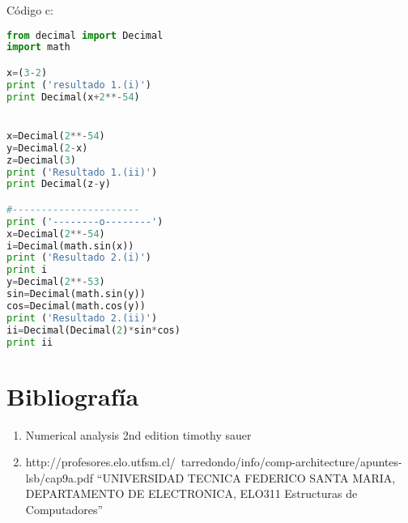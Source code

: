 \documentclass[a4paper,11pt]{article}
\begin{document}
Código c:
\begin{lstlisting}[frame=single, language=Python]
from decimal import Decimal
import math

x=(3-2)
print ('resultado 1.(i)')
print Decimal(x+2**-54)


x=Decimal(2**-54)
y=Decimal(2-x)
z=Decimal(3)
print ('Resultado 1.(ii)')
print Decimal(z-y)

#----------------------
print ('--------o--------')
x=Decimal(2**-54)
i=Decimal(math.sin(x))
print ('Resultado 2.(i)')
print i
y=Decimal(2**-53)
sin=Decimal(math.sin(y))
cos=Decimal(math.cos(y))
print ('Resultado 2.(ii)')
ii=Decimal(Decimal(2)*sin*cos)
print ii
\end{lstlisting}
\section{Bibliografía}
\begin{enumerate}
 \item Numerical analysis 2nd edition timothy sauer
 \item http://profesores.elo.utfsm.cl/~tarredondo/info/comp-architecture/apuntes-lsb/cap9a.pdf “UNIVERSIDAD TECNICA FEDERICO SANTA MARIA, DEPARTAMENTO DE ELECTRONICA, ELO311 Estructuras de Computadores” 
\end{enumerate}
\end{document}
